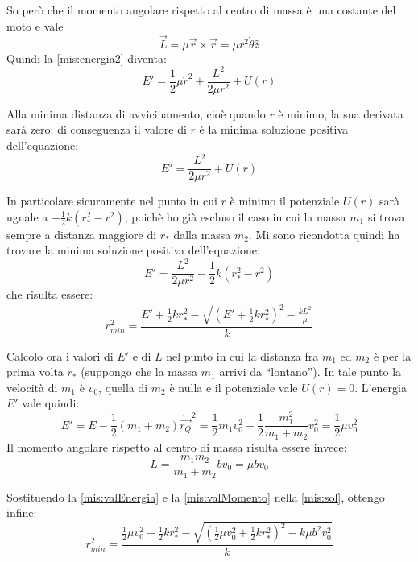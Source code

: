 \documentclass[../main.tex]{subfiles}
\begin{document}
So però che il momento angolare rispetto al centro di massa è una costante del moto e vale 
\begin{equation*}
	\vec L=\mu \vec r \times \dot {\vec r}=\mu r^2\dot\theta \hat z
\end{equation*}
Quindi la \cref{mis:energia2} diventa:
\begin{equation*}
	E'=\frac12\mu\dot r^2+\frac{L^2}{2\mu r^2}+U(r)
\end{equation*}

Alla minima distanza di avvicinamento, cioè quando $r$ è minimo, la sua derivata sarà zero; di conseguenza il valore di $r$ è la minima soluzione positiva dell'equazione:
\begin{equation*}
	E'=\frac{L^2}{2\mu r^2}+U(r)
\end{equation*}

In particolare sicuramente nel punto in cui $r$ è minimo il potenziale $U(r)$ sarà uguale a $-\frac12k(r_*^2-r^2)$, poichè ho già escluso il caso in cui la massa $m_1$ si trova sempre a distanza maggiore di $r_*$ dalla massa $m_2$. Mi sono ricondotta quindi ha trovare la minima soluzione positiva dell'equazione:
\begin{equation*}
	E'=\frac{L^2}{2\mu r^2}-\frac12k(r_*^2-r^2)
\end{equation*}
che risulta essere:
\begin{equation}\label{mis:sol}
	r_{min}^2=\frac{E'+\frac12 kr_*^2-\sqrt{(E'+\frac12 kr_*^2)^2-\frac{kL^2}{\mu}}}{k}
\end{equation}

Calcolo ora i valori di $E'$ e di $L$ nel punto in cui la distanza fra $m_1$ ed $m_2$ è per la prima volta $r_*$ (suppongo che la massa $m_1$ arrivi da ``lontano''). In tale punto la velocità di $m_1$ è $v_0$, quella di $m_2$ è nulla e il potenziale vale $U(r)=0$. L'energia $E'$ vale quindi:
\begin{equation}\label{mis:valEnergia}
	E'=E-\frac12(m_1+m_2)\dot{\overrightarrow{r_Q}}^2=\frac12m_1v_0^2-\frac12 \frac{m_1^2}{m_1+m_2}v_0^2=\frac12 \mu v_0^2
\end{equation}
Il momento angolare rispetto al centro di massa risulta essere invece:
\begin{equation}\label{mis:valMomento}
	L=\frac{m_1m_2}{m_1+m_2}bv_0=\mu bv_0
\end{equation}

Sostituendo la \cref{mis:valEnergia} e la \cref{mis:valMomento} nella \cref{mis:sol}, ottengo infine:
\begin{equation*}
	r_{min}^2=\frac{\frac12\mu v_0^2+\frac12 kr_*^2-\sqrt{(\frac12\mu v_0^2+\frac12 kr_*^2)^2-k\mu b^2v_0^2}}{k}
\end{equation*}
\end{document}
